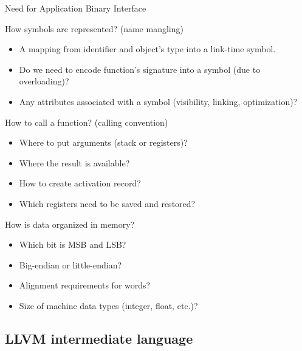 \documentclass[8pt]{beamer}
\begin{document}
\begin{frame}{Need for Application Binary Interface}
  \begin{block}{How symbols are represented? (name mangling)}
    \begin{itemize}
      \item A mapping from identifier and object's type into a link-time symbol.
      \item Do we need to encode function's signature into a symbol (due to overloading)?
      \item Any attributes associated with a symbol (visibility, linking, optimization)?
    \end{itemize}
  \end{block}
    
  \begin{block}{How to call a function? (calling convention)}
    \begin{itemize}
      \item Where to put arguments (stack or registers)?
      \item Where the result is available?
      \item How to create activation record?
      \item Which registers need to be saved and restored?
    \end{itemize}
  \end{block}

  \begin{block}{How is data organized in memory?}
    \begin{itemize}
      \item Which bit is MSB and LSB?
      \item Big-endian or little-endian?
      \item Alignment requirements for words?
      \item Size of machine data types (integer, float, etc.)?
    \end{itemize}
  \end{block}
\end{frame}

\subsection*{LLVM intermediate language}
\end{document}
